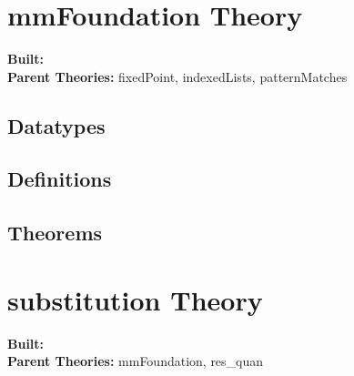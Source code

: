 \documentclass[11pt, twoside]{article}
\begin{document}



\tableofcontents
\cleardoublepage
\HOLpagestyle

\section{mmFoundation Theory}
\begin{flushleft}
\textbf{Built:} \HOLmmFoundationDate \\[2pt]
\textbf{Parent Theories:} fixedPoint, indexedLists, patternMatches
\end{flushleft}

\subsection{Datatypes}

\HOLmmFoundationDatatypes

\subsection{Definitions}

\HOLmmFoundationDefinitions

\subsection{Theorems}

\HOLmmFoundationTheorems

\section{substitution Theory}
\begin{flushleft}
\textbf{Built:} \HOLsubstitutionDate \\[2pt]
\textbf{Parent Theories:} mmFoundation, res_quan
\end{flushleft}
\end{document}
